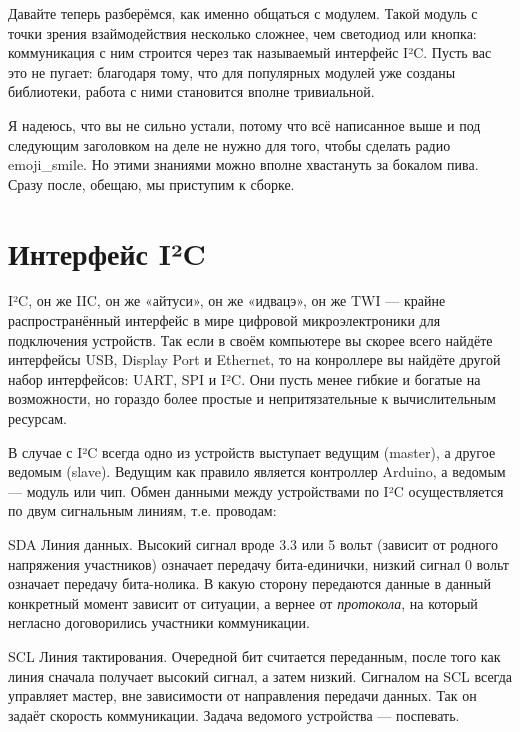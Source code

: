 Давайте теперь разберёмся, как именно общаться с модулем. Такой модуль с точки зрения взаймодействия несколько сложнее, чем светодиод или кнопка: коммуникация с ним строится через так называемый интерфейс I²C. Пусть вас это не пугает: благодаря тому, что для популярных модулей уже созданы библиотеки, работа с ними становится вполне тривиальной.

\begin{Note}
  Я надеюсь, что вы не сильно устали, потому что всё написанное выше и под следующим заголовком на деле не нужно для того, чтобы сделать радио \textbar emoji\_smile\textbar. Но этими знаниями можно вполне хвастануть за бокалом пива. Сразу после, обещаю, мы приступим к сборке.
\end{Note}

\section{Интерфейс I²C}
\label{I2C}

I²C, он же IIC, он же «айтуси», он же «идвацэ», он же TWI — крайне распространённый интерфейс в мире цифровой микроэлектроники для подключения устройств. Так если в своём компьютере вы скорее всего найдёте интерфейсы USB, Display Port и Ethernet, то на конроллере вы найдёте другой набор интерфейсов: UART, SPI и I²C. Они пусть менее гибкие и богатые на возможности, но гораздо более простые и непритязательные к вычислительным ресурсам.

В случае с I²C всегда одно из устройств выступает ведущим (master), а другое ведомым (slave). Ведущим как правило является контроллер Arduino, а ведомым — модуль или чип. Обмен данными между устройствами по I²C осуществляется по двум сигнальным линиям, т.е. проводам:


SDA Линия данных. Высокий сигнал вроде 3.3 или 5 вольт (зависит от родного напряжения участников) означает передачу бита-единички, низкий сигнал 0 вольт означает передачу бита-нолика. В какую сторону передаются данные в данный конкретный момент зависит от ситуации, а вернее от \emph{протокола}, на который негласно договорились участники коммуникации.

SCL Линия тактирования. Очередной бит считается переданным, после того как линия сначала получает высокий сигнал, а затем низкий. Сигналом на SCL всегда управляет мастер, вне зависимости от направления передачи данных. Так он задаёт скорость коммуникации. Задача ведомого устройства — поспевать.


